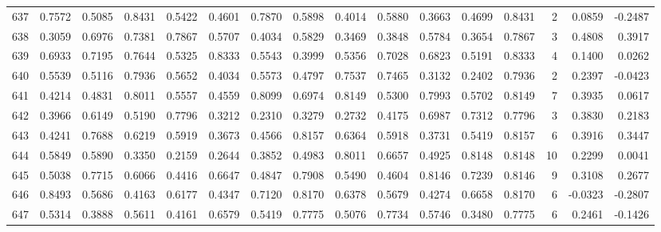 \begin{tabular}{lrrrrrrrrrrrrrrr}
637 &      0.7572 &  0.5085 &  0.8431 &  0.5422 &  0.4601 &  0.7870 &  0.5898 &  0.4014 &  0.5880 &  0.3663 &   0.4699 &     0.8431 &      2 &                    0.0859 &                    -0.2487 \\
638 &      0.3059 &  0.6976 &  0.7381 &  0.7867 &  0.5707 &  0.4034 &  0.5829 &  0.3469 &  0.3848 &  0.5784 &   0.3654 &     0.7867 &      3 &                    0.4808 &                     0.3917 \\
639 &      0.6933 &  0.7195 &  0.7644 &  0.5325 &  0.8333 &  0.5543 &  0.3999 &  0.5356 &  0.7028 &  0.6823 &   0.5191 &     0.8333 &      4 &                    0.1400 &                     0.0262 \\
640 &      0.5539 &  0.5116 &  0.7936 &  0.5652 &  0.4034 &  0.5573 &  0.4797 &  0.7537 &  0.7465 &  0.3132 &   0.2402 &     0.7936 &      2 &                    0.2397 &                    -0.0423 \\
641 &      0.4214 &  0.4831 &  0.8011 &  0.5557 &  0.4559 &  0.8099 &  0.6974 &  0.8149 &  0.5300 &  0.7993 &   0.5702 &     0.8149 &      7 &                    0.3935 &                     0.0617 \\
642 &      0.3966 &  0.6149 &  0.5190 &  0.7796 &  0.3212 &  0.2310 &  0.3279 &  0.2732 &  0.4175 &  0.6987 &   0.7312 &     0.7796 &      3 &                    0.3830 &                     0.2183 \\
643 &      0.4241 &  0.7688 &  0.6219 &  0.5919 &  0.3673 &  0.4566 &  0.8157 &  0.6364 &  0.5918 &  0.3731 &   0.5419 &     0.8157 &      6 &                    0.3916 &                     0.3447 \\
644 &      0.5849 &  0.5890 &  0.3350 &  0.2159 &  0.2644 &  0.3852 &  0.4983 &  0.8011 &  0.6657 &  0.4925 &   0.8148 &     0.8148 &     10 &                    0.2299 &                     0.0041 \\
645 &      0.5038 &  0.7715 &  0.6066 &  0.4416 &  0.6647 &  0.4847 &  0.7908 &  0.5490 &  0.4604 &  0.8146 &   0.7239 &     0.8146 &      9 &                    0.3108 &                     0.2677 \\
646 &      0.8493 &  0.5686 &  0.4163 &  0.6177 &  0.4347 &  0.7120 &  0.8170 &  0.6378 &  0.5679 &  0.4274 &   0.6658 &     0.8170 &      6 &                   -0.0323 &                    -0.2807 \\
647 &      0.5314 &  0.3888 &  0.5611 &  0.4161 &  0.6579 &  0.5419 &  0.7775 &  0.5076 &  0.7734 &  0.5746 &   0.3480 &     0.7775 &      6 &                    0.2461 &                    -0.1426 \\

\end{tabular}
